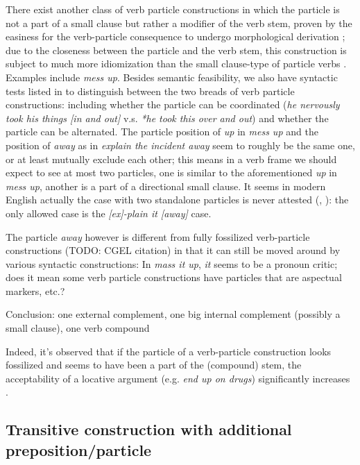 \documentclass[UTF8, a4paper, oneside, scheme=plain, 12pt]{ctexbook}
\newcommand*{\citepage}[1]{p.~{#1}}
\newcommand{\form}[1]{\emph{#1}}
\begin{document}
There exist another class of verb particle constructions in which 
the particle is not a part of a small clause
but rather a modifier of the verb stem,
proven by the easiness for the verb-particle consequence 
to undergo morphological derivation \citep{farrell2005english};
due to the closeness between the particle and the verb stem, 
this construction is subject to much more idiomization than 
the small clause-type of particle verbs
\citep{wurmbrand2000structure}.
Examples include \form{mess up}.
Besides semantic feasibility, 
we also have syntactic tests listed in \citet{wurmbrand2000structure} to distinguish 
between the two breads of verb particle constructions:
including whether the particle can be coordinated 
(\form{he nervously took his things [in and out]} 
v.s. \form{*he took this over and out})
and whether the particle can be alternated.
The particle position of \form{up} in \form{mess up} 
and the position of \form{away} as in \form{explain the incident away}
seem to roughly be the same one, 
or at least mutually exclude each other; 
this means in a verb frame we should expect to see at most two particles, 
one is similar to the aforementioned \form{up} in \form{mess up},
another is a part of a directional small clause.
It seems in modern English actually the case with two standalone particles 
is never attested (\citealt[\citepage{293}]{dixon2005semantic}, \citealt[\citepage{286}]{cgel}):  
the only allowed case is the \form{[ex]-plain it [away]} case.

The particle \form{away} however is different from fully fossilized verb-particle constructions 
(TODO: CGEL citation) in that it can still be moved around by various syntactic constructions:
In \form{mass it up}, \form{it} seems to be a pronoun critic;
does it mean some verb particle constructions have particles that are aspectual markers, etc.?

Conclusion: one external complement, one big internal complement (possibly a small clause), one verb compound

Indeed, it's observed that if the particle of a verb-particle construction looks fossilized 
and seems to have been a part of the (compound) stem, 
the acceptability of a locative argument (e.g. \form{end up on drugs}) significantly increases
\citep{farrell2005english}.

\subsection{Transitive construction with additional preposition/particle}
\end{document}
